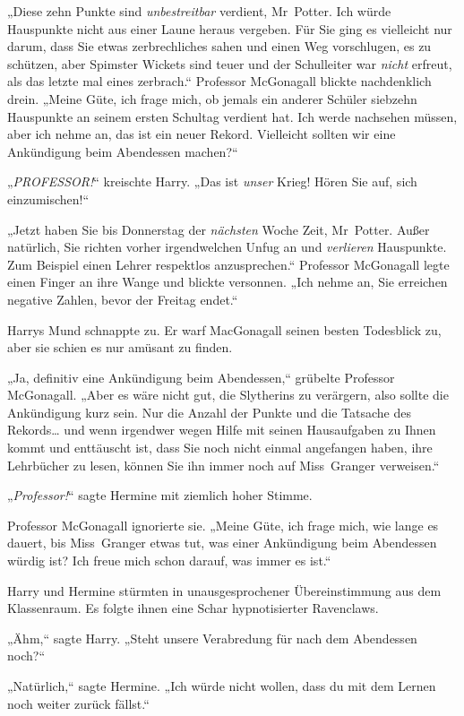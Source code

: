{„Diese zehn Punkte sind \emph{unbestreitbar} verdient, Mr~Potter. Ich würde Hauspunkte nicht aus einer Laune heraus vergeben. Für Sie ging es vielleicht nur darum, dass Sie etwas zerbrechliches sahen und einen Weg vorschlugen, es zu schützen, aber Spimster Wickets sind teuer und der Schulleiter war \emph{nicht} erfreut, als das letzte mal eines zerbrach.“ Professor McGonagall blickte nachdenklich drein. „Meine Güte, ich frage mich, ob jemals ein anderer Schüler siebzehn Hauspunkte an seinem ersten Schultag verdient hat. Ich werde nachsehen müssen, aber ich nehme an, das ist ein neuer Rekord. Vielleicht sollten wir eine Ankündigung beim Abendessen machen?“

„\emph{PROFESSOR!}“ kreischte Harry. „Das ist \emph{unser} Krieg! Hören Sie auf, sich einzumischen!“

„Jetzt haben Sie bis Donnerstag der \emph{nächsten} Woche Zeit, Mr~Potter. Außer natürlich, Sie richten vorher irgendwelchen Unfug an und \emph{verlieren} Hauspunkte. Zum Beispiel einen Lehrer respektlos anzusprechen.“ Professor McGonagall legte einen Finger an ihre Wange und blickte versonnen. „Ich nehme an, Sie erreichen negative Zahlen, bevor der Freitag endet.“

Harrys Mund schnappte zu. Er warf MacGonagall seinen besten Todesblick zu, aber sie schien es nur amüsant zu finden.

„Ja, definitiv eine Ankündigung beim Abendessen,“ grübelte Professor McGonagall. „Aber es wäre nicht gut, die Slytherins zu verärgern, also sollte die Ankündigung kurz sein. Nur die Anzahl der Punkte und die Tatsache des Rekords… und wenn irgendwer wegen Hilfe mit seinen Hausaufgaben zu Ihnen kommt und enttäuscht ist, dass Sie noch nicht einmal angefangen haben, ihre Lehrbücher zu lesen, können Sie ihn immer noch auf Miss~Granger verweisen.“

„\emph{Professor!}“ sagte Hermine mit ziemlich hoher Stimme.

Professor McGonagall ignorierte sie. „Meine Güte, ich frage mich, wie lange es dauert, bis Miss~Granger etwas tut, was einer Ankündigung beim Abendessen würdig ist? Ich freue mich schon darauf, was immer es ist.“

Harry und Hermine stürmten in unausgesprochener Übereinstimmung aus dem Klassenraum. Es folgte ihnen eine Schar hypnotisierter Ravenclaws.

„Ähm,“ sagte Harry. „Steht unsere Verabredung für nach dem Abendessen noch?“

„Natürlich,“ sagte Hermine. „Ich würde nicht wollen, dass du mit dem Lernen noch weiter zurück fällst.“

}
